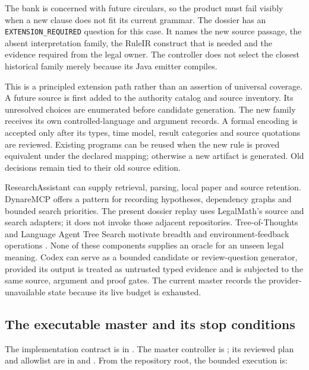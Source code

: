 The bank is concerned with future circulars, so the product must fail visibly
when a new clause does not fit its current grammar. The dossier has an
\texttt{EXTENSION\_REQUIRED} question for this case. It names the new source
passage, the absent interpretation family, the RuleIR construct that is needed
and the evidence required from the legal owner. The controller does not select
the closest historical family merely because its Java emitter compiles.

This is a principled extension path rather than an assertion of universal
coverage. A future source is first added to the authority catalog and source
inventory. Its unresolved choices are enumerated before candidate generation.
The new family receives its own controlled-language and argument records. A
formal encoding is accepted only after its types, time model, result categories
and source quotations are reviewed. Existing programs can be reused when the
new rule is proved equivalent under the declared mapping; otherwise a new
artifact is generated. Old decisions remain tied to their old source edition.

ResearchAssistant can supply retrieval, parsing, local paper and source
retention. DynareMCP offers a pattern for recording hypotheses,
dependency graphs and bounded search priorities. The present dossier replay
uses LegalMath's source and search adapters; it does not invoke those adjacent
repositories. Tree-of-Thoughts and Language
Agent Tree Search motivate breadth and environment-feedback operations
\citep{treeofthoughts2023,lats2024}. None of these components supplies an
oracle for an unseen legal meaning. Codex can serve as a bounded candidate or
review-question generator, provided its output is treated as untrusted typed
evidence and is subjected to the same source, argument and proof gates. The
current master records the provider-unavailable state because its live budget
is exhausted.

\subsection{The executable master and its stop conditions}

The implementation contract is in
. The
master controller is
; its reviewed plan and allowlist
are in  and
. From the
repository root, the bounded execution is:


